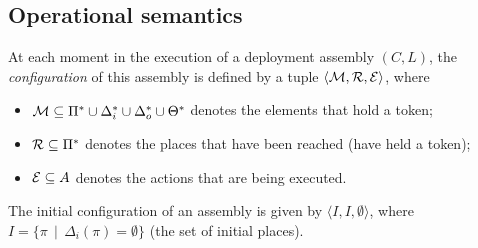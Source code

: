 \subsection{Operational semantics}
\label{subsec:operational_semantics}

At each moment in the execution of a \mad deployment assembly
$(C, L)$, the \emph{configuration} of this assembly is defined by a
tuple $\langle \mathcal{M}, \mathcal{R}, \mathcal{E} \rangle$, where

\begin{itemize}
  \item $\mathcal{M} \subseteq \Pi^{*} \cup
    \Delta_{i}^{*}\cup\Delta_{o}^{*}\cup\Theta^{*}$ denotes the
    elements that hold a token;
  \item $\mathcal{R} \subseteq \Pi^*$ denotes the places that have been
    reached (have held a token);
  \item $\mathcal{E} \subseteq A$ denotes the actions that are being executed.
\end{itemize}

The initial configuration of an assembly is given by $\langle I, I,
\emptyset\rangle$, where $I = \{ \pi \, \mid \, \Delta_i(\pi) =
\emptyset \}$ (\ie the set of initial places).







